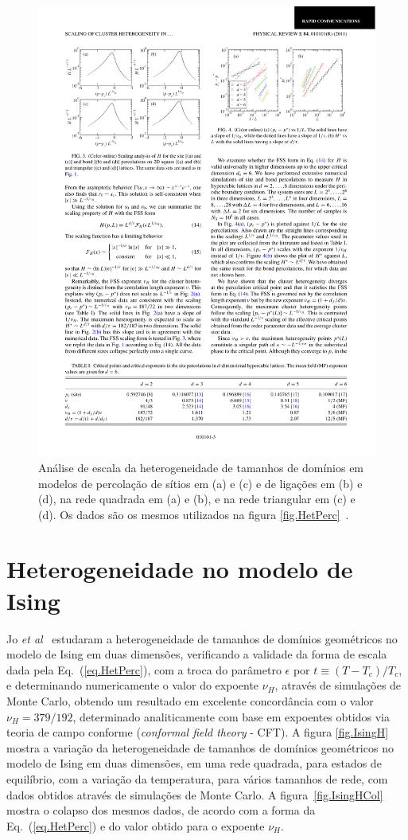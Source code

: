 \begin{figure}
 \includegraphics[width=14cm]{img/HetPercCol.pdf}
 \caption{Análise de escala da heterogeneidade de tamanhos de domínios em modelos de percolação de sítios em (a) e (c) e de ligações em (b) e (d), na rede quadrada em (a) e (b), e na rede triangular em (c) e (d). Os dados são os mesmos utilizados na figura \ref{fig.HetPerc}~\cite{NohLeePark}.}
\label{fig.HetPercCol}
\end{figure}


\section{Heterogeneidade no modelo de Ising}

Jo \textit{et al}~\cite{JoYiBaekKim} estudaram a heterogeneidade de tamanhos de domínios geométricos no modelo de Ising em duas dimensões, verificando a validade da forma de escala dada pela Eq.~(\ref{eq.HetPerc}), com a troca do parâmetro $\epsilon$ por $t \equiv (T-T_c)/T_c$, e determinando numericamente o valor do expoente $\nu_H$, através de simulações de Monte Carlo, obtendo um resultado em excelente concordância com o valor $\nu_H = 379/192$, determinado analiticamente com base em expoentes obtidos via teoria de campo conforme (\textit{conformal field theory} - CFT). A figura \ref{fig.IsingH} mostra a variação da heterogeneidade de tamanhos de domínios geométricos no modelo de Ising em duas dimensões, em uma rede quadrada, para estados de equilíbrio, com a variação da temperatura, para vários tamanhos de rede, com dados obtidos através de simulações de Monte Carlo. A figura~\ref{fig.IsingHCol} mostra o colapso dos mesmos dados, de acordo com a forma da Eq.~(\ref{eq.HetPerc}) e do valor obtido para o expoente $\nu_H$.

